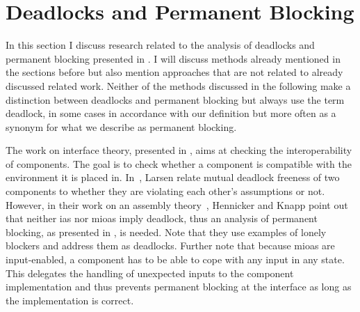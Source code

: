 

\section{Deadlocks and Permanent Blocking}
\label{sect_related_dl}
In this section I discuss research related to the analysis of deadlocks and permanent blocking presented in \Chap{\ref{chap_block}}.
I will discuss methods already mentioned in the sections before but also mention approaches that are not related to already discussed related work.
Neither of the methods discussed in the following make a distinction between deadlocks and permanent blocking but always use the term deadlock, in some cases in accordance with our definition but more often as a synonym for what we describe as permanent blocking.

The work on interface theory, presented in \Sect{\ref{sect_related_interface}}, aims at checking the interoperability of components.
The goal is to check whether a component is compatible with the environment it is placed in.
In~\cite{larsen2006, larsen2007}, Larsen \etal relate mutual deadlock freeness of two components to whether they are violating each other's assumptions or not.
However, in their work on an assembly theory~\cite{hennicker2015}, Hennicker and Knapp point out that neither \glspl{ia} nor \glspl{mioa} imply deadlock, thus an analysis of permanent blocking, as presented in \Chap{\ref{chap_block}}, is needed.
Note that they use examples of lonely blockers and address them as deadlocks.
Further note that because \glspl{mioa} are input-enabled, a component has to be able to cope with any input in any state.
This delegates the handling of unexpected inputs to the component implementation and thus prevents permanent blocking at the interface as long as the implementation is correct.

